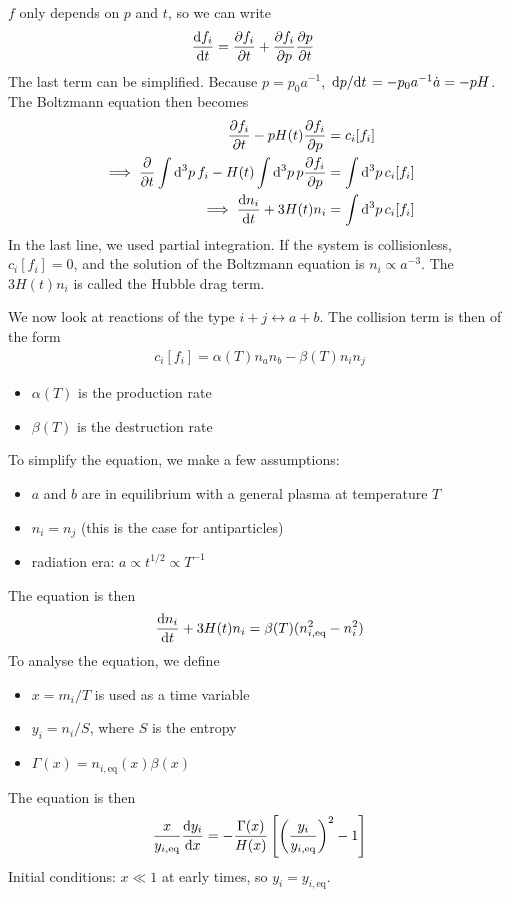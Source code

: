 $f$ only depends on $p$ and $t$, so we can write
\begin{align*}
	\dv{f_i}{t} &= \pdv{f_i}{t} + \pdv{f_i}{p} \pdv{p}{t}
\end{align*}
The last term can be simplified. Because $p = p_0 a^{-1}$, $\dv*{p}{t} = -p_0 a^{-1} \dot{a} = - p H$. The Boltzmann equation then becomes
\begin{align*}
	\pdv{f_i}{t} - p H(t) \pdv{f_i}{p} &= c_i[f_i]\\
	\implies \pdv{}{t} \int \dd{^3 p} f_i - H(t) \int \dd{^3 p} p \pdv{f_i}{p} &= \int \dd{^3 p} c_i[f_i]\\
	\implies \dv{n_i}{t} + 3 H(t) n_i &= \int \dd{^3 p} c_i[f_i]
\end{align*}
In the last line, we used partial integration.
If the system is collisionless, $c_i[f_i]=0$, and the solution of the Boltzmann equation is $n_i \propto a^{-3}$. The $3H(t) n_i$ is called the Hubble drag term.

We now look at reactions of the type $i + j \leftrightarrow a + b$. The collision term is then of the form
\begin{align*}
	c_i[f_i] = \alpha(T) n_a n_b - \beta(T) n_i n_j
\end{align*}
\begin{itemize}
	\item $\alpha(T)$ is the production rate
	\item $\beta(T)$ is the destruction rate
\end{itemize}
To simplify the equation, we make a few assumptions:
\begin{itemize}
	\item $a$ and $b$ are in equilibrium with a general plasma at temperature $T$
	\item $n_i = n_j$ (this is the case for antiparticles)
	\item radiation era: $a \propto t^{1/2} \propto T^{-1}$
\end{itemize}
The equation is then
\begin{align*}
	\dv{n_i}{t} + 3 H(t) n_i = \beta(T) (n_{i, \text{eq}}^2 - n_i^2)
\end{align*}
To analyse the equation, we define
\begin{itemize}
	\item $x = m_i/T$ is used as a time variable
	\item $y_i = n_i/S$, where $S$ is the entropy
	\item $\Gamma(x) = n_{i, \text{eq}}(x) \beta(x)$
\end{itemize}
The equation is then
\begin{align*}
	\frac{x}{y_{i, \text{eq}}} \dv{y_i}{x} = - \frac{\Gamma(x)}{H(x)} \left[ \left( \frac{y_i}{y_{i,\text{eq}}} \right)^2 - 1 \right]
\end{align*}
Initial conditions: $x \ll 1$ at early times, so $y_i = y_{i, \text{eq}}$.

